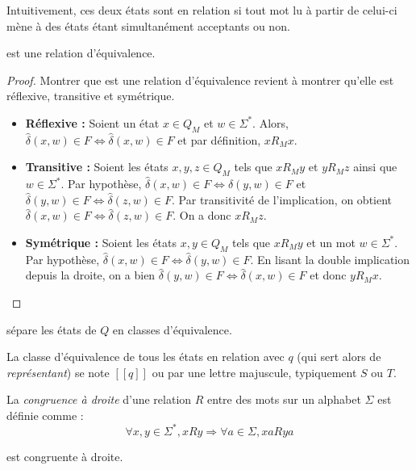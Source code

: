 	 Intuitivement, ces deux états sont en relation si tout mot lu à partir de celui-ci mène à des états étant simultanément acceptants ou non. 
	 
	 \begin{proposition}
	 	\rm est une relation d'équivalence.
	 \end{proposition}
	
	 \begin{proof} Montrer que \rm est une relation d'équivalence revient à montrer qu'elle est réflexive, transitive et symétrique.
	 	\begin{itemize}
	 		\item \textbf{Réflexive :} Soient un état $x \in Q_M$ et $w \in \Sigma^*$. Alors, $\hat{\delta}(x,w) \in F \iff \hat{\delta}(x,w) \in F$ et par définition, $xR_Mx$.
	 		\item \textbf{Transitive :} Soient les états $x,y,z \in Q_M$ tels que $xR_My$ et $yR_Mz$ ainsi que $w \in \Sigma^*$. Par hypothèse, $\hat{\delta}(x,w) \in F \iff \hat{\delta}(y,w)\in F$ et $\hat{\delta}(y,w) \in F\iff \hat{\delta}(z,w) \in F$. Par transitivité de l'implication, on obtient $\hat{\delta}(x,w) \in F \iff \hat{\delta}(z,w)\in F$. On a donc $xR_Mz$.
	 		\item \textbf{Symétrique : } Soient les états $x,y \in Q_M$ tels que $xR_My$ et un mot $w \in \Sigma^*$. Par hypothèse, $\hat{\delta}(x, w)\in F \iff \hat{\delta}(y, w)\in F$. En lisant la double implication depuis la droite, on a bien $\hat{\delta}(y, w) \in F\iff \hat{\delta}(x, w)\in F$ et donc $yR_Mx$.
	 	\end{itemize}
	 \end{proof}
	 
	 \begin{corollary}
	 	\rm sépare les états de $Q$ en classes d'équivalence.
	 \end{corollary}
	 
	 La classe d'équivalence de tous les états en relation \rm avec $q$ (qui sert alors de \emph{représentant}) se note $[[q]]$ ou par une lettre majuscule, typiquement $S$ ou $T$.
	 
	 La \emph{congruence à droite} d'une relation $R$ entre des mots sur un alphabet $\Sigma$ est définie comme :
	 $$
	 \forall x,y \in \Sigma^*, xRy \Rightarrow \forall a \in \Sigma, xaRya 
	 $$  
	 
	 \begin{proposition}
	 	\rm est congruente à droite.
	 \end{proposition}
	 
